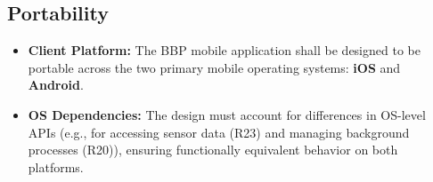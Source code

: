 \subsection{Portability}
\label{subsec:portability}%
\begin{itemize}[leftmargin=*, itemsep=2pt]
    \item \textbf{Client Platform:} The BBP mobile application shall be designed to be portable across the two primary mobile operating systems: \textbf{iOS} and \textbf{Android}.
    \item \textbf{OS Dependencies:} The design must account for differences in OS-level APIs (e.g., for accessing sensor data (R23) and managing background processes (R20)), ensuring functionally equivalent behavior on both platforms.
\end{itemize}



